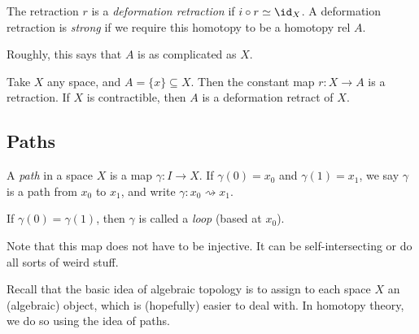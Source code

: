 \documentclass[a4paper]{article}
\begin{document}
\begin{defi}
  The retraction $r$ is a \emph{deformation retraction} if $i\circ r \simeq \id_X$. A deformation retraction is \emph{strong} if we require this homotopy to be a homotopy rel $A$.
\end{defi}
Roughly, this says that $A$ is as complicated as $X$.

\begin{eg}
  Take $X$ any space, and $A = \{x\}\subseteq X$. Then the constant map $r: X\to A$ is a retraction. If $X$ is contractible, then $A$ is a deformation retract of $X$.
\end{eg}

\subsection{Paths}
\begin{defi}[Path]
  A \emph{path} in a space $X$ is a map $\gamma: I\to X$. If $\gamma(0) = x_0$ and $\gamma(1) = x_1$, we say $\gamma$ is a path from $x_0$ to $x_1$, and write $\gamma: x_0 \rightsquigarrow x_1$.

  If $\gamma(0) = \gamma(1)$, then $\gamma$ is called a \emph{loop} (based at $x_0$).
  \begin{center}
  \end{center}
\end{defi}
Note that this map does not have to be injective. It can be self-intersecting or do all sorts of weird stuff.

Recall that the basic idea of algebraic topology is to assign to each space $X$ an (algebraic) object, which is (hopefully) easier to deal with. In homotopy theory, we do so using the idea of paths.
\end{document}
